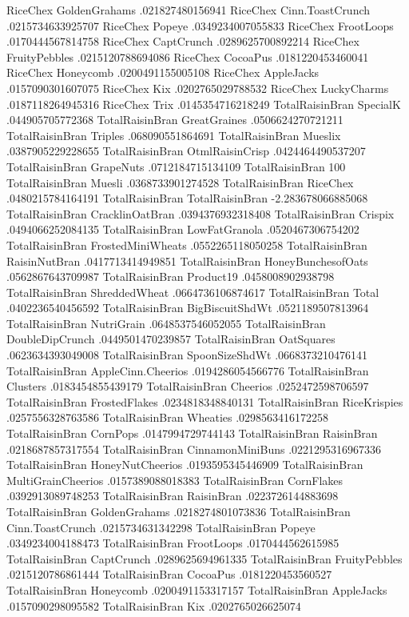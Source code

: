 RiceChex	GoldenGrahams	.021827480156941
RiceChex	Cinn.ToastCrunch	.0215734633925707
RiceChex	Popeye	.0349234007055833
RiceChex	FrootLoops	.0170444567814758
RiceChex	CaptCrunch	.0289625700892214
RiceChex	FruityPebbles	.0215120788694086
RiceChex	CocoaPus	.0181220453460041
RiceChex	Honeycomb	.0200491155005108
RiceChex	AppleJacks	.0157090301607075
RiceChex	Kix	.0202765029788532
RiceChex	LuckyCharms	.0187118264945316
RiceChex	Trix	.0145354716218249
TotalRaisinBran	SpecialK	.044905705772368
TotalRaisinBran	GreatGraines	.0506624270721211
TotalRaisinBran	Triples	.068090551864691
TotalRaisinBran	Mueslix	.0387905229228655
TotalRaisinBran	OtmlRaisinCrisp	.0424464490537207
TotalRaisinBran	GrapeNuts	.0712184715134109
TotalRaisinBran	100%
TotalRaisinBran	Muesli	.0368733901274528
TotalRaisinBran	RiceChex	.0480215784164191
TotalRaisinBran	TotalRaisinBran	-2.283678066885068
TotalRaisinBran	CracklinOatBran	.0394376932318408
TotalRaisinBran	Crispix	.0494066252084135
TotalRaisinBran	LowFatGranola	.0520467306754202
TotalRaisinBran	FrostedMiniWheats	.0552265118050258
TotalRaisinBran	RaisinNutBran	.0417713414949851
TotalRaisinBran	HoneyBunchesofOats	.0562867643709987
TotalRaisinBran	Product19	.0458008902938798
TotalRaisinBran	ShreddedWheat	.0664736106874617
TotalRaisinBran	Total	.0402236540456592
TotalRaisinBran	BigBiscuitShdWt	.0521189507813964
TotalRaisinBran	NutriGrain	.0648537546052055
TotalRaisinBran	DoubleDipCrunch	.0449501470239857
TotalRaisinBran	OatSquares	.0623634393049008
TotalRaisinBran	SpoonSizeShdWt	.0668373210476141
TotalRaisinBran	AppleCinn.Cheerios	.0194286054566776
TotalRaisinBran	Clusters	.0183454855439179
TotalRaisinBran	Cheerios	.0252472598706597
TotalRaisinBran	FrostedFlakes	.0234818348840131
TotalRaisinBran	RiceKrispies	.0257556328763586
TotalRaisinBran	Wheaties	.0298563416172258
TotalRaisinBran	CornPops	.0147994729744143
TotalRaisinBran	RaisinBran	.0218687857317554
TotalRaisinBran	CinnamonMiniBuns	.0221295316967336
TotalRaisinBran	HoneyNutCheerios	.0193595345446909
TotalRaisinBran	MultiGrainCheerios	.0157389088018383
TotalRaisinBran	CornFlakes	.0392913089748253
TotalRaisinBran	RaisinBran	.0223726144883698
TotalRaisinBran	GoldenGrahams	.0218274801073836
TotalRaisinBran	Cinn.ToastCrunch	.0215734631342298
TotalRaisinBran	Popeye	.0349234004188473
TotalRaisinBran	FrootLoops	.0170444562615985
TotalRaisinBran	CaptCrunch	.0289625694961335
TotalRaisinBran	FruityPebbles	.0215120786861444
TotalRaisinBran	CocoaPus	.0181220453560527
TotalRaisinBran	Honeycomb	.0200491153317157
TotalRaisinBran	AppleJacks	.0157090298095582
TotalRaisinBran	Kix	.0202765026625074
